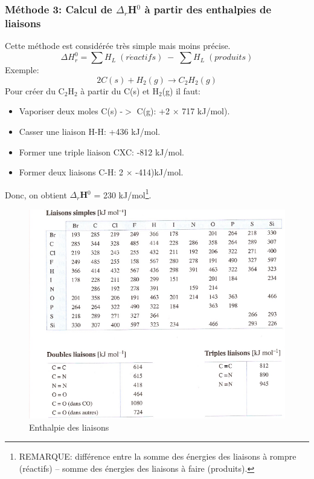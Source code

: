 \documentclass[10pt,a4paper]{book}
\newcommand{\x}{$\times$ }
\begin{document}
\subsubsection{Méthode 3: Calcul de \texorpdfstring{$\Delta_r$H$^0$}{Delta H0} à partir des enthalpies de liaisons}

Cette méthode est considérée très simple mais moins précise. 
\begin{displaymath}
\Delta H^0_r = \sum H_L \; (r\acute{e}actifs) \; - \; \sum H_L \; (produits)
\end{displaymath}
Exemple:
\begin{displaymath}
2C(s) + H_2(g) \longrightarrow C_2H_2(g)
\end{displaymath}
Pour créer du C$_2$H$_2$ à partir du C(s) et H$_2$(g) il faut:
\begin{itemize}
\item Vaporiser deux moles C(s) -$>$ C(g): +2 \x 717 kJ/mol).
\item Casser une liaison H-H: +436 kJ/mol.
\item Former une triple liaison CXC: -812 kJ/mol.
\item Former deux liaisons C-H: 2 \x -414)kJ/mol.
\end{itemize}
Donc, on obtient \textbf{$\Delta_r$H$^0$} = 230 kJ/mol\footnote{REMARQUE: différence entre la somme des énergies des liaisons à rompre (réactifs) – somme des énergies des liaisons à faire (produits).}.
\begin{figure}[h!]
\begin{center}
\includegraphics[scale=0.75]{./assets/enthalpy_links.png}
\caption{Enthalpie des liaisons}
\label{fig:enthalpy_links}
\end{center}
\end{figure}
\newpage
\end{document}
